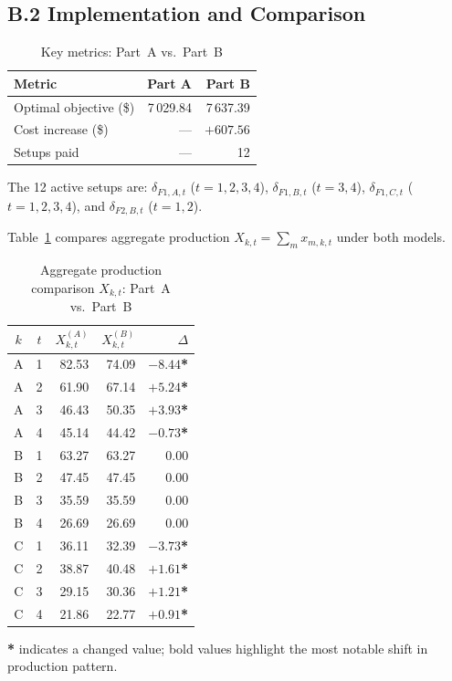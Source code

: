 \documentclass[11pt,a4paper]{article}
\begin{document}
\subsection{B.2\; Implementation and Comparison}

\begin{table}[H]
\centering
\caption{Key metrics: Part~A vs.\ Part~B}
\begin{tabular}{lrr}
\toprule
Metric & Part A & Part B \\
\midrule
Optimal objective (\$) & 7\,029.84 & 7\,637.39 \\
Cost increase (\$)     & ---       & $+607.56$ \\
Setups paid            & ---       & 12        \\
\bottomrule
\end{tabular}
\end{table}

The 12 active setups are:
$\delta_{F1,A,t}$ ($t=1,2,3,4$),
$\delta_{F1,B,t}$ ($t=3,4$),
$\delta_{F1,C,t}$ ($t=1,2,3,4$), and
$\delta_{F2,B,t}$ ($t=1,2$).

Table~\ref{tab:comparison} compares aggregate production
$X_{k,t}=\sum_m x_{m,k,t}$ under both models.

\begin{table}[H]
\centering
\caption{Aggregate production comparison $X_{k,t}$: Part~A vs.\ Part~B}
\label{tab:comparison}
\small
\begin{tabular}{ccrrr}
\toprule
$k$ & $t$ & $X^{(A)}_{k,t}$ & $X^{(B)}_{k,t}$ & $\Delta$ \\
\midrule
A & 1 & 82.53 & 74.09 & $-8.44$\;\textbf{*} \\
A & 2 & 61.90 & 67.14 & $+5.24$\;\textbf{*} \\
A & 3 & 46.43 & 50.35 & $+3.93$\;\textbf{*} \\
A & 4 & 45.14 & 44.42 & $-0.73$\;\textbf{*} \\
\midrule
B & 1 & 63.27 & 63.27 & $\phantom{+}0.00$ \\
B & 2 & 47.45 & 47.45 & $\phantom{+}0.00$ \\
B & 3 & 35.59 & 35.59 & $\phantom{+}0.00$ \\
B & 4 & 26.69 & 26.69 & $\phantom{+}0.00$ \\
\midrule
C & 1 & 36.11 & 32.39 & $-3.73$\;\textbf{*} \\
C & 2 & 38.87 & 40.48 & $+1.61$\;\textbf{*} \\
C & 3 & 29.15 & 30.36 & $+1.21$\;\textbf{*} \\
C & 4 & 21.86 & 22.77 & $+0.91$\;\textbf{*} \\
\bottomrule
\end{tabular}
\par\smallskip
\textbf{*} indicates a changed value; bold values highlight the most notable
shift in production pattern.
\end{table}
\end{document}
